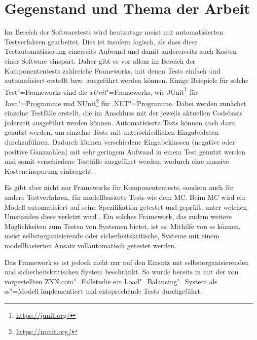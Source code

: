 \chapter{Gegenstand und Thema der Arbeit}
\label{ch:intro}

Im Bereich der Softwaretests wird heutzutage meist mit automatisierten Testverfahren gearbeitet.
Dies ist insofern logisch, als dass diese Testautomatisierung einerseits Aufwand und damit andererseits auch Kosten einer Software einspart.
Daher gibt es vor allem im Bereich der Komponententests zahlreiche Frameworks, mit denen Tests einfach und automatisiert erstellt bzw. ausgeführt werden können.
Einige Beispiele für solche Test"=Frameworks sind die \emph{xUnit}"=Frameworks, wie JUnit\footnote{\url{https://junit.org/}} für Java"=Programme und NUnit\footnote{\url{https://nunit.org/}} für .NET"=Programme.
Dabei werden zunächst einzelne Testfälle erstellt, die im Anschluss mit der jeweils aktuellen Codebasis jederzeit ausgeführt werden können.
Automatisierte Tests können auch dazu genutzt werden, um einzelne Tests mit unterschiedlichen Eingabedaten durchzuführen.
Dadurch können verschiedene Eingabeklassen (\zB negative oder positive Ganzzahlen) mit sehr geringem Aufwand in einem Test genutzt werden und somit verschiedene Testfälle ausgeführt werden, wodurch eine massive Kosteneinsparung einhergeht \cite{Polo2013}.

Es gibt aber nicht nur Frameworks für Komponententests, sondern auch für andere Testverfahren, \zB für modellbasierte Tests wie dem \gls{MC}.
Beim \gls{MC} wird ein Modell automatisiert auf seine Spezifikation getestet und geprüft, unter welchen Umständen diese verletzt wird \cite{Grumberg1999,Habermaier2015}.
Ein solches Framework, das zudem weitere Möglichkeiten zum Testen von Systemen bietet, ist \gls{ss}.
Mithilfe von \gls{ss} können, meist selbstorganisierende oder sicherheitskritische, Systeme mit einem modellbasierten Ansatz vollautomatisch getestet werden.

Das Framework \gls{ss} ist jedoch nicht nur auf den Einsatz mit selbstorganisierenden und sicherheitskritischen System beschränkt.
So wurde bereits in \cite{Eberhardinger2017} mit der von \citeauthor{Cheng2008} vorgestellten ZNN.com"=Fallstudie \cite{Cheng2008} ein Load"=Balancing"=System als \gls{ss}"=Modell implementiert und entsprechende Tests durchgeführt.

